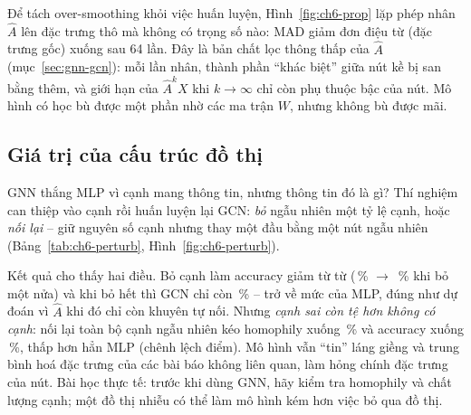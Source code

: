
Để tách over-smoothing khỏi việc huấn luyện, Hình~\ref{fig:ch6-prop} lặp phép nhân $\hat A$ lên đặc trưng thô mà không có
trọng số nào: MAD giảm đơn điệu từ  (đặc trưng gốc) xuống 
sau 64 lần. Đây là bản chất lọc thông thấp của $\hat A$ (mục~\ref{sec:gnn-gcn}): mỗi lần nhân, thành phần ``khác biệt''
giữa nút kề bị san bằng thêm, và giới hạn của $\hat A^k X$ khi $k\to\infty$ chỉ còn phụ thuộc bậc của nút. Mô hình có học
bù được một phần nhờ các ma trận $W$, nhưng không bù được mãi.


\subsection{Giá trị của cấu trúc đồ thị}

GNN thắng MLP vì cạnh mang thông tin, nhưng thông tin đó là gì? Thí nghiệm can thiệp vào cạnh rồi huấn luyện lại GCN:
\emph{bỏ} ngẫu nhiên một tỷ lệ cạnh, hoặc \emph{nối lại} -- giữ nguyên số cạnh nhưng thay một đầu bằng một nút ngẫu nhiên
(Bảng~\ref{tab:ch6-perturb}, Hình~\ref{fig:ch6-perturb}).


Kết quả cho thấy hai điều. Bỏ cạnh làm accuracy giảm từ từ (\,\% $\to$
\,\% khi bỏ một nửa) và khi bỏ hết thì GCN chỉ còn
\,\% -- trở về mức của MLP, đúng như dự đoán vì $\hat A$ khi đó chỉ còn khuyên tự nối.
Nhưng \emph{cạnh sai còn tệ hơn không có cạnh}: nối lại toàn bộ cạnh ngẫu nhiên kéo homophily xuống
\,\% và accuracy xuống \,\%, thấp hơn hẳn
MLP (chênh lệch  điểm). Mô hình vẫn ``tin'' láng giềng và trung bình hoá đặc trưng của các bài
báo không liên quan, làm hỏng chính đặc trưng của nút. Bài học thực tế: trước khi dùng GNN, hãy kiểm tra homophily và chất
lượng cạnh; một đồ thị nhiễu có thể làm mô hình kém hơn việc bỏ qua đồ thị.

